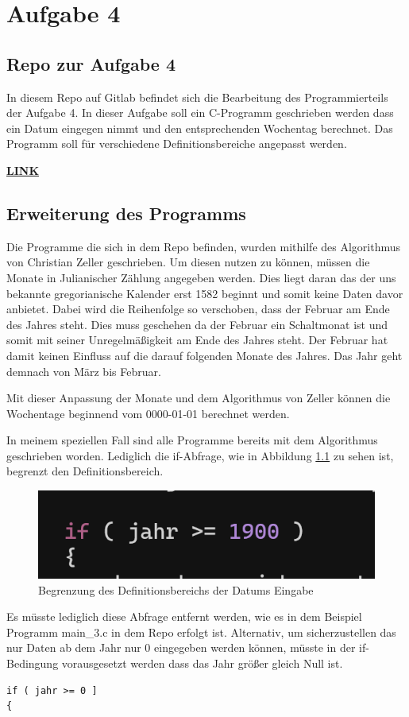 \chapter{Aufgabe 4}
\section{Repo zur Aufgabe 4}
In diesem Repo auf Gitlab befindet sich die Bearbeitung des Programmierteils der Aufgabe 4. 
In dieser Aufgabe soll ein C-Programm geschrieben werden dass ein Datum eingegen nimmt und den entsprechenden Wochentag berechnet.
Das Programm soll für verschiedene Definitionsbereiche angepasst werden. \par
\href{https://gitlab.thga.de/daniel.krueger/pruefung_sose_2023_aufgabe_4_getopt}{\textbf{LINK}}

\section{Erweiterung des Programms}
Die Programme die sich in dem Repo befinden, wurden mithilfe des Algorithmus von Christian Zeller geschrieben.
Um diesen nutzen zu können, müssen die Monate in Julianischer Zählung angegeben werden.
Dies liegt daran das der uns bekannte gregorianische Kalender erst 1582 beginnt und somit keine Daten davor anbietet.
Dabei wird die Reihenfolge so verschoben, dass der Februar am Ende des Jahres steht.
Dies muss geschehen da der Februar ein Schaltmonat ist und somit mit seiner Unregelmäßigkeit am Ende des Jahres steht.
Der Februar hat damit keinen Einfluss auf die darauf folgenden Monate des Jahres.
Das Jahr geht demnach von März bis Februar.\par
Mit dieser Anpassung der Monate und dem Algorithmus von Zeller können die Wochentage beginnend vom 0000-01-01 berechnet werden.\par
In meinem speziellen Fall sind alle Programme bereits mit dem Algorithmus geschrieben worden.
Lediglich die if-Abfrage, wie in Abbildung \ref{definitionsbereich} zu sehen ist, begrenzt den Definitionsbereich.

\begin{figure}[h]
	\centering
	\includegraphics[scale=0.7]{Images/Definitionsbereich_4.png}
	\caption{Begrenzung des Definitionsbereichs der Datums Eingabe}
	\label{definitionsbereich}
\end{figure}

Es müsste lediglich diese Abfrage entfernt werden, wie es in dem Beispiel Programm main\_3.c in dem Repo erfolgt ist. 
Alternativ, um sicherzustellen das nur Daten ab dem Jahr nur 0 eingegeben werden können, müsste in der if-Bedingung vorausgesetzt werden dass das Jahr größer gleich Null ist.
\begin{lstlisting}
if ( jahr >= 0 ]
{
\end{lstlisting}
